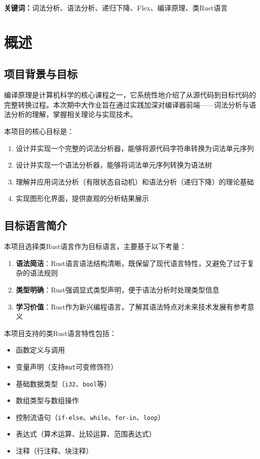\documentclass[12pt,a4paper]{ctexart}
\begin{document}
\textbf{关键词：}词法分析、语法分析、递归下降、Flex、编译原理、类Rust语言

\newpage

\section{概述}

\subsection{项目背景与目标}

编译原理是计算机科学的核心课程之一，它系统性地介绍了从源代码到目标代码的完整转换过程。本次期中大作业旨在通过实践加深对编译器前端——词法分析与语法分析的理解，掌握相关理论与实现技术。

本项目的核心目标是：
\begin{enumerate}
    \item 设计并实现一个完整的词法分析器，能够将源代码字符串转换为词法单元序列
    \item 设计并实现一个语法分析器，能够将词法单元序列转换为语法树
    \item 理解并应用词法分析（有限状态自动机）和语法分析（递归下降）的理论基础
    \item 实现图形化界面，提供直观的分析结果展示
\end{enumerate}

\subsection{目标语言简介}

本项目选择类Rust语言作为目标语言，主要基于以下考量：

\begin{enumerate}
    \item \textbf{语法简洁}：Rust语言语法结构清晰，既保留了现代语言特性，又避免了过于复杂的语法规则
    \item \textbf{类型明确}：Rust强调显式类型声明，便于语法分析时处理类型信息
    \item \textbf{学习价值}：Rust作为新兴编程语言，了解其语法特点对未来技术发展有参考意义
\end{enumerate}

本项目支持的类Rust语言特性包括：
\begin{itemize}
    \item 函数定义与调用
    \item 变量声明（支持\texttt{mut}可变修饰符）
    \item 基础数据类型（\texttt{i32}、\texttt{bool}等）
    \item 数组类型与数组操作
    \item 控制流语句（\texttt{if-else}、\texttt{while}、\texttt{for-in}、\texttt{loop}）
    \item 表达式（算术运算、比较运算、范围表达式）
    \item 注释（行注释、块注释）
\end{itemize}
\end{document}
